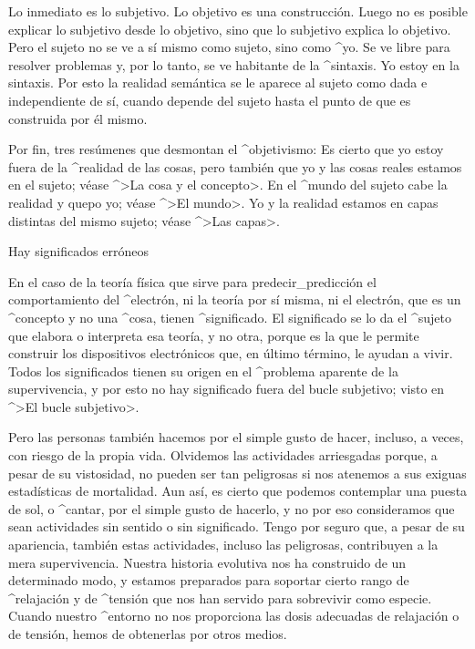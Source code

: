 Lo inmediato es lo subjetivo. Lo objetivo es una construcción. Luego no
es posible explicar lo subjetivo desde lo objetivo, sino que lo
subjetivo explica lo objetivo. Pero el sujeto no se ve a sí mismo como
sujeto, sino como ^{yo}. Se ve libre para resolver problemas y, por lo
tanto, se ve habitante de la ^{sintaxis}. Yo estoy en la sintaxis. Por
esto la realidad semántica se le aparece al sujeto como dada e
independiente de sí, cuando depende del sujeto hasta el punto de que es
construida por él mismo.

Por fin, tres resúmenes que desmontan el ^{objetivismo}:
\beginpoints
\point Es cierto que yo estoy fuera de la ^{realidad} de las
cosas, pero también que yo y las cosas reales estamos en el sujeto;
 véase ^>La cosa y el concepto>.
\point En el ^{mundo} del sujeto cabe la realidad y quepo yo;
 véase ^>El mundo>.
\point Yo y la realidad estamos en capas distintas del mismo sujeto;
 véase ^>Las capas>.
\endpoints


\Section Hay significados erróneos

En el caso de la teoría física que sirve para predecir_{predicción} el
comportamiento del ^{electrón}, ni la teoría por sí misma, ni el
electrón, que es un ^{concepto} y no una ^{cosa}, tienen ^{significado}.
El significado se lo da el ^{sujeto} que elabora o interpreta esa
teoría, y no otra, porque es la que le permite construir los
dispositivos electrónicos que, en último término, le ayudan a vivir.
Todos los significados tienen su origen en el ^{problema aparente} de la
supervivencia, y por esto no hay significado fuera del bucle subjetivo;
visto en ^>El bucle subjetivo>.

Pero las personas también hacemos por el simple gusto de hacer, incluso,
a veces, con riesgo de la propia vida. Olvidemos las actividades
arriesgadas porque, a pesar de su vistosidad, no pueden ser tan
peligrosas si nos atenemos a sus exiguas estadísticas de mortalidad. Aun
así, es cierto que podemos contemplar una puesta de sol, o ^{cantar},
por el simple gusto de hacerlo, y no por eso consideramos que sean
actividades sin sentido o sin significado. Tengo por seguro que, a pesar
de su apariencia, también estas actividades, incluso las peligrosas,
contribuyen a la mera supervivencia. Nuestra historia evolutiva nos ha
construido de un determinado modo, y estamos preparados para soportar
cierto rango de ^{relajación} y de ^{tensión} que nos han servido para
sobrevivir como especie. Cuando nuestro ^{entorno} no nos proporciona
las dosis adecuadas de relajación o de tensión, hemos de obtenerlas por
otros medios.

